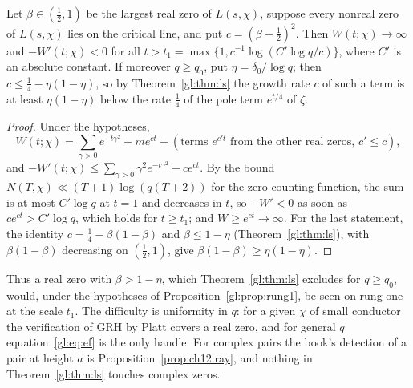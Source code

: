 \begin{proposition}\label{gl:prop:rung1}
Let $\beta\in(\tfrac12,1)$ be the largest real zero of $L(s,\chi)$, suppose every nonreal zero of $L(s,\chi)$ lies on the critical line, and put $c=(\beta-\tfrac12)^2$. Then $W(t;\chi)\to\infty$ and $-W'(t;\chi)<0$ for all $t>t_1=\max\{1,c^{-1}\log(C'\log q/c)\}$, where $C'$ is an absolute constant. If moreover $q\ge q_0$, put $\eta=\delta_0/\log q$; then $c\le\tfrac14-\eta(1-\eta)$, so by Theorem~\ref{gl:thm:ls} the growth rate $c$ of such a term is at least $\eta(1-\eta)$ below the rate $\tfrac14$ of the pole term $e^{t/4}$ of $\zeta$.
\end{proposition}

\begin{proof}
Under the hypotheses,
\[
W(t;\chi)=\sum_{\gamma>0}e^{-t\gamma^2}+me^{ct}+(\text{terms }e^{c't}\text{ from the other real zeros, }c'\le c),
\]
and $-W'(t;\chi)\le\sum_{\gamma>0}\gamma^2e^{-t\gamma^2}-ce^{ct}$. By the bound $N(T,\chi)\ll(T+1)\log(q(T+2))$ for the zero counting function, the sum is at most $C'\log q$ at $t=1$ and decreases in $t$, so $-W'<0$ as soon as $ce^{ct}>C'\log q$, which holds for $t\ge t_1$; and $W\ge e^{ct}\to\infty$. For the last statement, the identity $c=\tfrac14-\beta(1-\beta)$ and $\beta\le1-\eta$ (Theorem~\ref{gl:thm:ls}), with $\beta(1-\beta)$ decreasing on $(\tfrac12,1)$, give $\beta(1-\beta)\ge\eta(1-\eta)$.
\end{proof}

Thus a real zero with $\beta>1-\eta$, which Theorem~\ref{gl:thm:ls} excludes for $q\ge q_0$, would, under the hypotheses of Proposition~\ref{gl:prop:rung1}, be seen on rung one at the scale $t_1$. The difficulty is uniformity in $q$: for a given $\chi$ of small conductor the verification of GRH by Platt \cite{Platt16} covers a real zero, and for general $q$ equation~\eqref{gl:eq:ef} is the only handle. For complex pairs the book's detection of a pair at height $a$ is Proposition~\ref{prop:ch12:ray}, and nothing in Theorem~\ref{gl:thm:ls} touches complex zeros.

